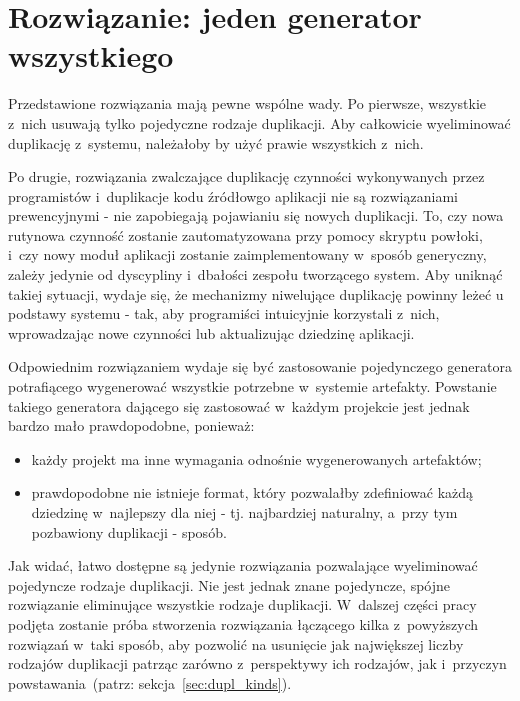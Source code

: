 \section{Rozwiązanie: jeden generator wszystkiego}

Przedstawione rozwiązania mają pewne wspólne wady.
Po pierwsze, wszystkie z~nich usuwają tylko pojedyczne rodzaje duplikacji.
Aby całkowicie wyeliminować duplikację z~systemu, należałoby by użyć prawie wszystkich z~nich.

Po drugie, rozwiązania zwalczające duplikację czynności wykonywanych przez programistów i~duplikacje kodu źródłowgo aplikacji nie są rozwiązaniami prewencyjnymi - nie zapobiegają pojawianiu się nowych duplikacji.
To, czy nowa rutynowa czynność zostanie zautomatyzowana przy pomocy skryptu powłoki, i~czy nowy moduł aplikacji zostanie zaimplementowany w~sposób generyczny, zależy jedynie od dyscypliny i~dbałości zespołu tworzącego system.
Aby uniknąć takiej sytuacji, wydaje się, że mechanizmy niwelujące duplikację powinny leżeć u podstawy systemu - tak, aby programiści intuicyjnie korzystali z~nich, wprowadzając nowe czynności lub aktualizując dziedzinę aplikacji.

Odpowiednim rozwiązaniem wydaje się być zastosowanie pojedynczego generatora potrafiącego wygenerować wszystkie potrzebne w~systemie artefakty.
Powstanie takiego generatora dającego się zastosować w~każdym projekcie jest jednak bardzo mało prawdopodobne, ponieważ:

\begin{itemize}
 \item każdy projekt ma inne wymagania odnośnie wygenerowanych artefaktów;
 \item prawdopodobne nie istnieje format, który pozwalałby zdefiniować każdą dziedzinę w~najlepszy dla niej - tj. najbardziej naturalny, a~przy tym pozbawiony duplikacji - sposób.
\end{itemize}

Jak widać, łatwo dostępne są jedynie rozwiązania pozwalające wyeliminować pojedyncze rodzaje duplikacji.
Nie jest jednak znane pojedyncze, spójne rozwiązanie eliminujące wszystkie rodzaje duplikacji.
W~dalszej części pracy podjęta zostanie próba stworzenia rozwiązania łączącego kilka z~powyższych rozwiązań w~taki sposób, aby pozwolić na usunięcie jak największej liczby rodzajów duplikacji patrząc zarówno z~perspektywy ich rodzajów, jak i~przyczyn powstawania~(patrz: sekcja~\ref{sec:dupl_kinds}).
